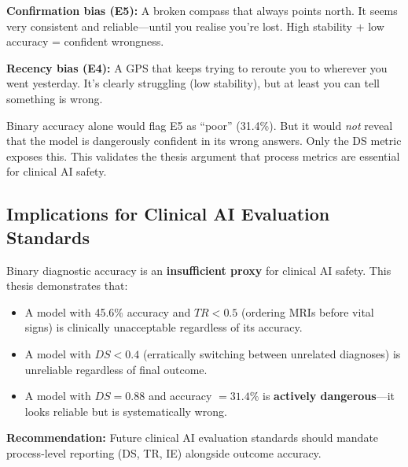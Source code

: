 \begin{analogybox}[\textcolor{white}{Simple Analogy}]
\textbf{Confirmation bias (E5):} A broken compass that always points north. It seems very consistent and reliable---until you realise you're lost. High stability + low accuracy = confident wrongness.

\textbf{Recency bias (E4):} A GPS that keeps trying to reroute you to wherever you went yesterday. It's clearly struggling (low stability), but at least you can tell something is wrong.
\end{analogybox}

\begin{mattersbox}[\textcolor{white}{Why It Matters for This Thesis}]
Binary accuracy alone would flag E5 as ``poor'' (31.4\%). But it would \textit{not} reveal that the model is dangerously confident in its wrong answers. Only the DS metric exposes this. This validates the thesis argument that process metrics are essential for clinical AI safety.
\end{mattersbox}

\subsection{Implications for Clinical AI Evaluation Standards}

\begin{acadbox}[\textcolor{white}{Academic Definition}]
Binary diagnostic accuracy is an \textbf{insufficient proxy} for clinical AI safety. This thesis demonstrates that:
\begin{itemize}
    \item A model with 45.6\% accuracy and $TR < 0.5$ (ordering MRIs before vital signs) is clinically unacceptable regardless of its accuracy.
    \item A model with $DS < 0.4$ (erratically switching between unrelated diagnoses) is unreliable regardless of final outcome.
    \item A model with $DS = 0.88$ and accuracy $= 31.4\%$ is \textbf{actively dangerous}---it looks reliable but is systematically wrong.
\end{itemize}

\textbf{Recommendation:} Future clinical AI evaluation standards should mandate process-level reporting (DS, TR, IE) alongside outcome accuracy.
\end{acadbox}

